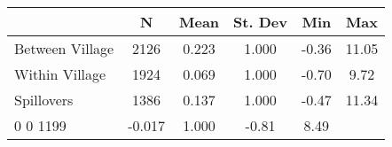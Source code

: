 \begin{tabular}{l*{5}{c}}\hline&\multicolumn{1}{c}{N}&\multicolumn{1}{c}{Mean}&\multicolumn{1}{c}{St. Dev}&\multicolumn{1}{c}{Min}&\multicolumn{1}{c}{Max}\\ \hline 
Between Village & 2126 & 0.223 & 1.000 & -0.36 & 11.05 \\
Within Village & 1924 & 0.069 & 1.000 & -0.70 & 9.72 \\
Spillovers & 1386 & 0.137 & 1.000 & -0.47 & 11.34 \\
0 0 1199 & -0.017 & 1.000 & -0.81 & 8.49 \\
\hline \end{tabular}
